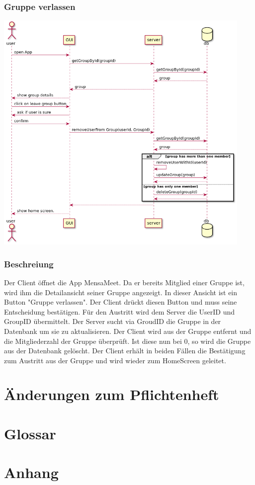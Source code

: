 \documentclass[a4paper]{scrreprt}
\begin{document}
\subsection{Gruppe verlassen}
\begin{center}
	\includegraphics[width=0.93\textwidth]{Sequenzdiagramme/leaveGroupSD.png}
\end{center}

\subsection*{Beschreiung}
Der Client öffnet die App MensaMeet. Da er bereits Mitglied einer Gruppe ist, wird ihm die Detailansicht seiner Gruppe angezeigt.
In dieser Ansicht ist ein Button "Gruppe verlassen". Der Client drückt diesen Button und muss seine Entscheidung bestätigen. Für den Austritt wird dem Server die UserID und GroupID übermittelt. Der Server sucht via GroudID die Gruppe in der Datenbank um sie zu aktualisieren. Der Client wird aus der Gruppe entfernt und die Mitgliederzahl der Gruppe überprüft. Ist diese nun bei 0, so wird die Gruppe aus der Datenbank gelöscht.
Der Client erhält in beiden Fällen die Bestätigung zum Austritt aus der Gruppe und wird wieder zum HomeScreen geleitet.


\chapter{Änderungen zum Pflichtenheft}

\chapter{Glossar}

\chapter{Anhang}
\end{document}
